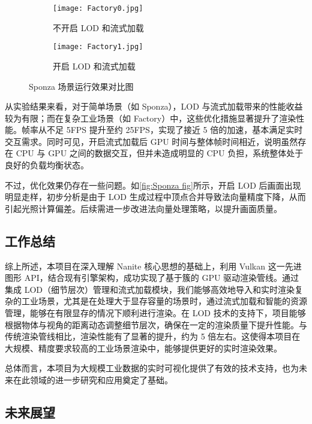 \begin{figure*}[h]
    \centering
    \begin{subfigure}[b]{0.48\linewidth}
        \centering
        \texttt{[image: Factory0.jpg]}
        \caption{不开启 LOD 和流式加载}
    \end{subfigure}%
    \hfill %
    \begin{subfigure}[b]{0.48\linewidth}
        \centering
        \texttt{[image: Factory1.jpg]}
        \caption{开启 LOD 和流式加载}
    \end{subfigure}%
    \caption{Sponza 场景运行效果对比图}
    \vspace{-0.2cm}
    \label{fig:Sponza fig}
\end{figure*}

从实验结果来看，对于简单场景（如 Sponza），LOD 与流式加载带来的性能收益较为有限；而在复杂工业场景（如 Factory）中，这些优化措施显著提升了渲染性能。帧率从不足 5FPS 提升至约 25FPS，实现了接近 5 倍的加速，基本满足实时交互需求。同时可见，开启流式加载后 GPU 时间与整体帧时间相近，说明虽然存在 CPU 与 GPU 之间的数据交互，但并未造成明显的 CPU 负担，系统整体处于良好的负载均衡状态。

不过，优化效果仍存在一些问题。如\autoref{fig:Sponza fig}所示，开启 LOD 后画面出现明显走样，初步分析是由于 LOD 生成过程中顶点合并导致法向量精度下降，从而引起光照计算偏差。后续需进一步改进法向量处理策略，以提升画面质量。

\subsection{工作总结}

综上所述，本项目在深入理解 Nanite 核心思想的基础上，利用 Vulkan 这一先进图形 API，结合现有引擎架构，成功实现了基于簇的 GPU 驱动渲染管线。通过集成 LOD（细节层次）管理和流式加载模块，我们能够高效地导入和实时渲染复杂的工业场景，尤其是在处理大于显存容量的场景时，通过流式加载和智能的资源管理，能够在有限显存的情况下顺利进行渲染。在 LOD 技术的支持下，项目能够根据物体与视角的距离动态调整细节层次，确保在一定的渲染质量下提升性能。与传统渲染管线相比，渲染性能有了显著的提升，约为 5 倍左右。这使得本项目在大规模、精度要求较高的工业场景渲染中，能够提供更好的实时渲染效果。

总体而言，本项目为大规模工业数据的实时可视化提供了有效的技术支持，也为未来在此领域的进一步研究和应用奠定了基础。

\subsection{未来展望}

